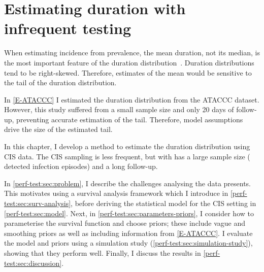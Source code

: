 \documentclass[thesis.tex]{subfiles}
\begin{document}
\ifSubfilesClassLoaded{


\setcounter{chapter}{4}
}

\chapter{Estimating duration with infrequent testing} \label{perf-test}

When estimating incidence from prevalence, the mean duration, not its median, is the most important feature of the duration distribution~\autocite{freemanPrevalence}.
Duration distributions tend to be right-skewed.
Therefore, estimates of the mean would be sensitive to the tail of the duration distribution.

In \cref{E-ATACCC} I estimated the duration distribution from the ATACCC dataset.
However, this study suffered from a small sample size and only 20 days of follow-up, preventing accurate estimation of the tail.
Therefore, model assumptions drive the size of the estimated tail.

In this chapter, I develop a method to estimate the duration distribution using CIS data.
The CIS sampling is less frequent, but with has a large sample size ( detected infection episodes) and a long follow-up.

In \cref{perf-test:sec:problem}, I describe the challenges analysing the data presents.
This motivates using a survival analysis framework which I introduce in \cref{perf-test:sec:surv-analysis}, before deriving the statistical model for the CIS setting in \cref{perf-test:sec:model}.
Next, in \cref{perf-test:sec:parameters-priors}, I consider how to parameterise the survival function and choose priors; these include vague and smoothing priors as well as including information from \cref{E-ATACCC}.
I evaluate the model and priors using a simulation study (\cref{perf-test:sec:simulation-study}), showing that they perform well.
Finally, I discuss the results in \cref{perf-test:sec:discussion}.
\end{document}
